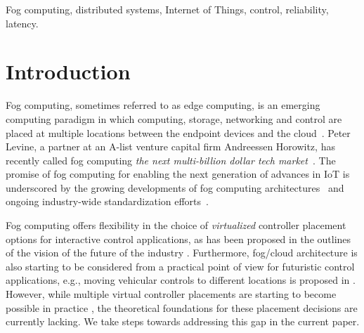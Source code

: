 \documentclass[10pt, journal, letterpaper]{IEEEtran}
\newcommand{\1}{\ensuremath{\mathbf{1}}} %
\begin{document}
\begin{IEEEkeywords}
Fog computing, distributed systems, Internet of Things, control, reliability, latency.
\end{IEEEkeywords}
\vspace*{-0.0cm}


\section{Introduction} %


Fog computing, sometimes referred to as edge computing, is an emerging computing paradigm in which computing, storage, networking and control are placed at multiple locations between the endpoint devices and the cloud~\cite{bonomi2012fog,Chiang2016Fog}. Peter Levine, a partner at an A-list venture capital firm Andreessen Horowitz, has recently called fog computing \emph{the next multi-billion dollar tech market}~\cite{Levine2016End}. The promise of fog computing for enabling the next generation of advances in IoT is underscored by the growing developments of fog computing architectures~\cite{AmazonGreenGrass,AzureEdge2017} and ongoing industry-wide standardization efforts~\cite{OpenFogReferenceArchitecture2017,ETSI_MEC2017}.

Fog computing offers %
flexibility in the choice of {\em virtualized} controller placement options for interactive control applications, as has been proposed in the outlines of the vision of the future of the industry
\cite{bonomi2012fog, Chiang2016Fog, OpenFogReferenceArchitecture2017}. Furthermore, fog/cloud architecture is also starting to be considered from a practical point of view for futuristic control applications, e.g., moving vehicular controls to different locations is proposed in \cite{Esen15, Qi2016Design}. However, while multiple virtual controller placements are starting to become possible in practice \cite{Abdelaal17, Vick16, Yannuzzi2017Cities, Faruque16}, the theoretical foundations for these placement decisions are currently lacking. We take steps towards addressing this gap in the current paper. %
\end{document}
